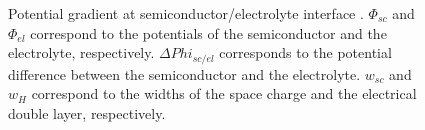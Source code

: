 \begin{figure}[h]
\centering

\caption{Potential gradient at semiconductor/electrolyte interface 
\citep{marcus2006}. $\Phi_{sc}$ and $\Phi_{el}$ correspond to the 
potentials of the semiconductor and the electrolyte, respectively. 
$\Delta Phi _{sc/el}$ corresponds to the potential difference between 
the semiconductor and the electrolyte. $w_{sc}$ and $w_{H}$ correspond to 
the widths of the space charge and the electrical double layer, 
respectively.}
\label{fig_interface_potential}
\end{figure}
